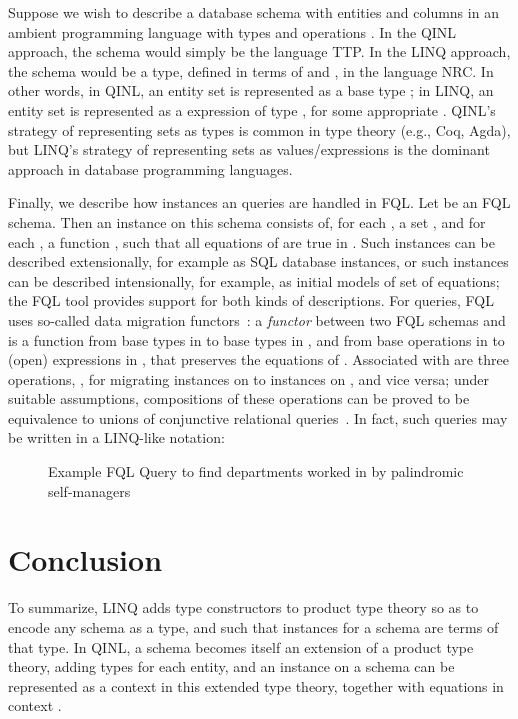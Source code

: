 \documentclass[11pt]{article}
\theoremstyle{remark}
\theoremstyle{definition}
\begin{document}
Suppose we wish to describe a database schema with entities  and columns  in an ambient programming language with types  and operations .  In the QINL approach, the schema would simply be the language TTP.  In the LINQ approach, the schema would be a type, defined in terms of  and , in the language NRC.  In other words, in QINL, an entity set  is represented as a base type ; in LINQ, an entity set  is represented as a expression of type , for some appropriate .  QINL's  strategy of representing sets as types is common in type theory (e.g., Coq, Agda), but LINQ's strategy of representing sets as values/expressions is the dominant approach in database programming languages.  

Finally, we describe how instances an queries are handled in FQL. Let  be an FQL schema.  Then an instance  on this schema consists of, for each , a set , and for each , a function , such that all equations of  are true in .  Such instances can be described extensionally, for example as SQL database instances, or such instances can be described intensionally, for example, as initial models of set of equations; the FQL tool provides support for both kinds of descriptions.  For queries, FQL uses so-called data migration functors~\cite{Spivak:2012:FDM:2324905.2325108}: a {\it functor}  between two FQL schemas  and  is a function from base types in  to base types in , and from base operations in  to (open) expressions in , that preserves the equations of .  Associated with  are three operations, , for migrating instances on  to instances on , and vice versa; under suitable assumptions, compositions of these operations can be proved to be equivalence to unions of conjunctive relational queries~\cite{relfound}.  In fact, such queries may be written in a LINQ-like notation:

\begin{figure}[h]
\caption{Example FQL Query to find departments worked in by palindromic self-managers}

\end{figure}
\newpage

\section{Conclusion}

To summarize, LINQ adds type constructors to product type theory so as to encode any schema as a type, and such that instances for a schema are terms of that type. In QINL, a schema becomes itself an extension of a product type theory, adding types for each entity, and an instance on a schema can be represented as a context  in this extended type theory, together with equations in context .
\end{document}
